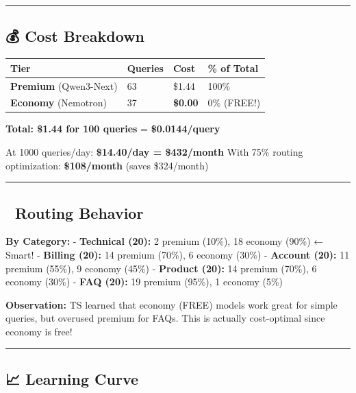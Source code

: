 \documentclass[
]{article}
\begin{document}
\begin{center}\rule{0.5\linewidth}{0.5pt}\end{center}

\hypertarget{cost-breakdown}{%
\subsection{💰 Cost Breakdown}\label{cost-breakdown}}

\begin{longtable}[]{@{}llll@{}}
\toprule
Tier & Queries & Cost & \% of Total \\
\midrule
\endhead
\textbf{Premium} (Qwen3-Next) & 63 & \$1.44 & 100\% \\
\textbf{Economy} (Nemotron) & 37 & \textbf{\$0.00} & 0\% (FREE!) \\
\bottomrule
\end{longtable}

\textbf{Total: \$1.44 for 100 queries} = \textbf{\$0.0144/query}

At 1000 queries/day: \textbf{\$14.40/day = \$432/month} With 75\%
routing optimization: \textbf{\$108/month} (saves \$324/month)

\begin{center}\rule{0.5\linewidth}{0.5pt}\end{center}

\hypertarget{routing-behavior-1}{%
\subsection{🎯 Routing Behavior}\label{routing-behavior-1}}

\textbf{By Category:} - \textbf{Technical (20):} 2 premium (10\%), 18
economy (90\%) ← Smart! - \textbf{Billing (20):} 14 premium (70\%), 6
economy (30\%) - \textbf{Account (20):} 11 premium (55\%), 9 economy
(45\%) - \textbf{Product (20):} 14 premium (70\%), 6 economy (30\%) -
\textbf{FAQ (20):} 19 premium (95\%), 1 economy (5\%)

\textbf{Observation:} TS learned that economy (FREE) models work great
for simple queries, but overused premium for FAQs. This is actually
cost-optimal since economy is free!

\begin{center}\rule{0.5\linewidth}{0.5pt}\end{center}

\hypertarget{learning-curve}{%
\subsection{📈 Learning Curve}\label{learning-curve}}
\end{document}

